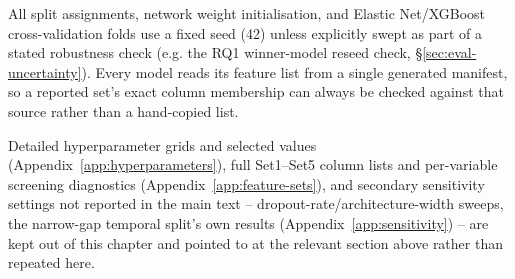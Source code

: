 All split assignments, network weight initialisation, and Elastic Net/XGBoost cross-validation
folds use a fixed seed (42) unless explicitly swept as part of a stated robustness check (e.g. the
RQ1 winner-model reseed check, \S\ref{sec:eval-uncertainty}). Every model reads its feature list
from a single generated manifest, so a reported set's exact column membership can always be
checked against that source rather than a hand-copied list.

Detailed hyperparameter grids and selected values (Appendix~\ref{app:hyperparameters}), full
Set1--Set5 column lists and per-variable screening diagnostics (Appendix~\ref{app:feature-sets}),
and secondary sensitivity settings not reported in the main text -- dropout-rate/architecture-width
sweeps, the narrow-gap temporal split's own results (Appendix~\ref{app:sensitivity}) -- are kept
out of this chapter and pointed to at the relevant section above rather than repeated here.

